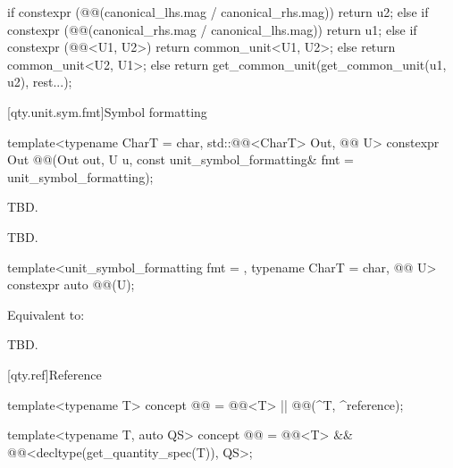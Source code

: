 \begin{itemdescr}
\begin{codeblock}
{{    if constexpr (@@(canonical_lhs.mag / canonical_rhs.mag))
      return u2;
    else if constexpr (@@(canonical_rhs.mag / canonical_lhs.mag))
      return u1;
    else {
      if constexpr (@@<U1, U2>{})
        return common_unit<U1, U2>{};
      else
        return common_unit<U2, U1>{};
    }
  }
} else
  return get_common_unit(get_common_unit(u1, u2), rest...);
\end{codeblock}
\end{itemdescr}

[qty.unit.sym.fmt]{Symbol formatting}

\begin{itemdecl}
template<typename CharT = char, std::@@<CharT> Out, @@ U>
constexpr Out @@(Out out, U u,
                             const unit_symbol_formatting& fmt = unit_symbol_formatting{});
\end{itemdecl}

\begin{itemdescr}
\pnum
\effects
TBD.

\pnum
\returns
TBD.
\end{itemdescr}

\begin{itemdecl}
template<unit_symbol_formatting fmt = {}, typename CharT = char, @@ U>
constexpr auto @@(U);
\end{itemdecl}

\begin{itemdescr}
\pnum
\effects
Equivalent to:
\begin{codeblock}
TBD.
\end{codeblock}
\end{itemdescr}

[qty.ref]{Reference}

\begin{itemdecl}
template<typename T>
concept @@ = @@<T> || @@(^T, ^reference);

template<typename T, auto QS>
concept @@ = @@<T> && @@<decltype(get_quantity_spec(T{})), QS>;
\end{itemdecl}

